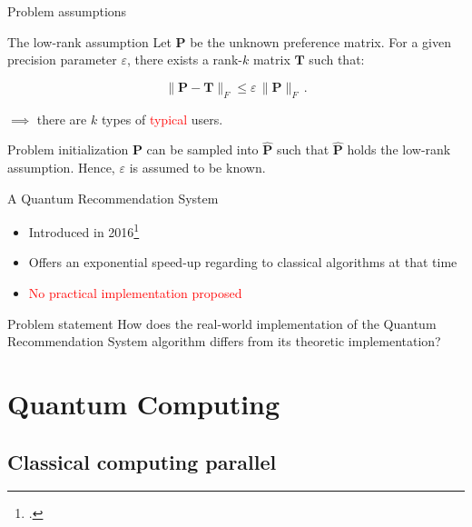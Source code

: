\documentclass{beamer}
\begin{document}
\begin{frame}{Problem assumptions}
    \begin{exampleblock}{The low-rank assumption}
        Let $\mathbf{P}$ be the unknown preference matrix. For a given precision parameter $\varepsilon$, there exists a rank-$k$ matrix $\mathbf{T}$ such that:
        
        \[\|\mathbf{P}-\mathbf{T}\|_F\leqslant\varepsilon\,\|\mathbf{P}\|_F\,.\]
    \end{exampleblock}\pause
    $\implies$ there are $k$ types of \textcolor<3>{red}{typical} users.\pause\pause
    
    \begin{exampleblock}{Problem initialization}
        $\mathbf{P}$ can be sampled into $\hat{\mathbf{P}}$ such that $\hat{\mathbf{P}}$ holds the low-rank assumption. Hence, $\varepsilon$ is assumed to be known.
    \end{exampleblock}
\end{frame}

\begin{frame}{A Quantum Recommendation System}
    \begin{itemize}
        \item Introduced in 2016\footcite{QRS}\pause
        \item Offers an exponential speed-up regarding to classical algorithms at that time\pause
        \item \textcolor<4>{red}{No practical implementation proposed}\pause\pause
    \end{itemize}
    
    \begin{block}{Problem statement}
        How does the real-world implementation of the Quantum Recommendation System algorithm differs from its theoretic implementation?
    \end{block}
\end{frame}

\section{Quantum Computing}
\subsection{Classical computing parallel}
\end{document}
